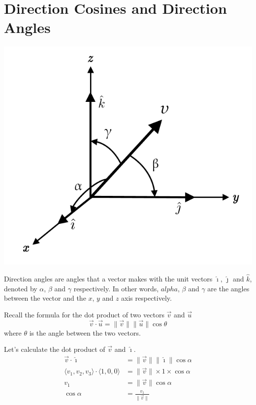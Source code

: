 \documentclass{report}
\begin{document}
\chapter{Direction Cosines and Direction Angles}

\begin{center}
    \includegraphics[scale=0.25]{assets/Direction_cosine_vector 1.png}
\end{center}

Direction angles are angles that a vector makes with the unit vectors
$\hat{\imath}$, $\hat{\jmath}$ and $\hat{k}$, denoted by $\alpha$, $\beta$ and
$\gamma$ respectively. In other words, $alpha$, $\beta$ and $\gamma$ are the
angles between the vector and the $x$, $y$ and $z$ axis respectively.

Recall the formula for the dot product of two vectors $\vec{v}$ and $\vec{u}$\[ \vec{v} \cdot \vec{u} = \lVert \vec{v} \rVert \lVert \vec{u} \rVert \cos\theta\] where $\theta$ is the angle between the two vectors.

Let's calculate the dot product of $\vec{v}$ and $\hat{\imath}$.
\begin{align*}
    \vec{v} \cdot \hat{\imath}                                  & = \lVert \vec{v} \rVert \lVert \hat{\imath} \rVert \cos\alpha \\
    \langle v_1, v_2, v_3 \rangle \cdot \langle 1, 0, 0 \rangle & = \lVert \vec{v} \rVert \times 1 \times \cos\alpha            \\
    v_1                                                         & = \lVert \vec{v} \rVert \cos\alpha                            \\
    \cos\alpha                                                  & = \frac{v_1}{\lVert \vec{v} \rVert}
\end{align*}
\end{document}
